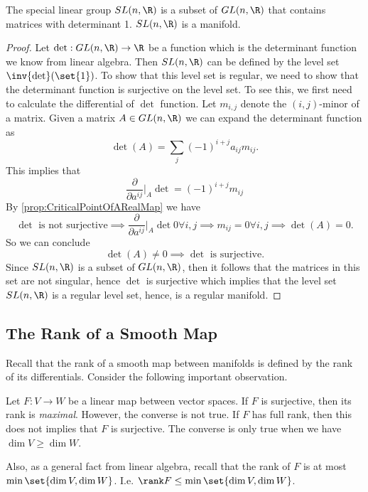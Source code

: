 \begin{proposition}
	\label{prop:SpecialLonearGroupIsManifold}
	The special linear group $ SL(n,\R) $ is a subset of $ GL(n,\R) $ that contains matrices with determinant 1. $ SL(n,\R) $ is a manifold.
\end{proposition}
\begin{proof}
	Let $ \det: GL(n,\R) \to \R $ be a function which is the determinant function we know from linear algebra. Then $ SL(n,\R) $ can be defined by the level set $ \inv{\det}(\set{1}) $. To show that this level set is regular, we need to show that the determinant function is surjective on the level set. To see this, we first need to calculate the differential of $ \det $ function. Let $ m_{i,j} $ denote the $ (i,j)\text{-minor} $ of a matrix. Given a matrix $ A \in GL(n,\R) $ we can expand the determinant function as
	\[ \det(A) = \sum_j (-1)^{i+j} a_{ij} m_{ij}. \]
	This implies that 
	\[ \frac{\partial}{\partial  a^{ij}}\big|_{A} \det = (-1)^{i+j} m_{ij} \]
	By \autoref{prop:CriticalPointOfARealMap} we have
	\[ \det\text{ is not surjective} \implies \frac{\partial}{\partial  a^{ij}}\big|_{A} \det 0 \forall i,j \implies m_{ij}=0 \forall i,j \implies \det(A)=0. \]
	So we can conclude 
	\[ \det(A) \neq 0 \implies \det\text{ is surjective}. \]
	Since $ SL(n,\R) $ is a subset of $ GL(n,\R) $, then it follows that the matrices in this set are not singular, hence $ \det $ is surjective which implies that the level set $ SL(n,\R) $  is a regular level set, hence, is a regular manifold.
\end{proof}


\subsection{The Rank of a Smooth Map}
Recall that the rank of a smooth map between manifolds is defined by the rank of its differentials. Consider the following important observation.

\begin{observation}
	Let $ F: V \to W $ be a linear map between vector spaces. If $ F $ is surjective, then its rank is \emph{maximal}. However, the converse is not true. If $ F $ has full rank, then this does not implies that $ F $ is surjective. The converse is only true when we have $ \dim V \geq \dim W $.
	
	Also, as a general fact from linear algebra, recall that the rank of $ F $ is at most $ \min\set{\dim V, \dim W} $. I.e.  $ \rank F \leq \min\set{\dim V, \dim W} $.
\end{observation}

